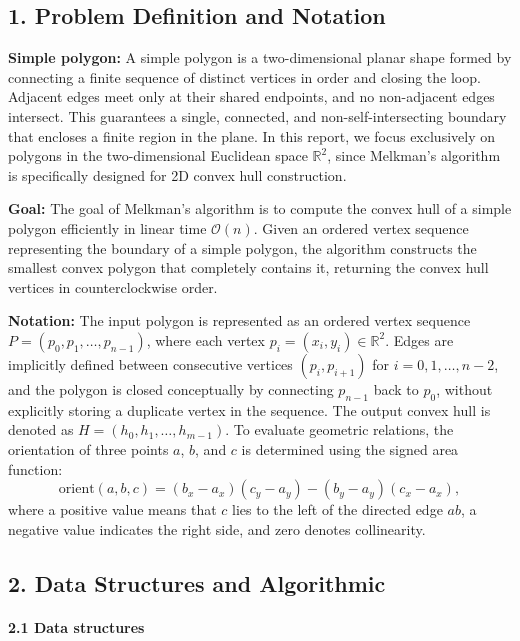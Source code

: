 \documentclass{article}
\begin{document}
\subsection*{1. Problem Definition and Notation}

\textbf{Simple polygon:} A simple polygon is a two-dimensional planar shape formed by connecting a finite sequence of distinct vertices in order and closing the loop. Adjacent edges meet only at their shared endpoints, and no non-adjacent edges intersect. This guarantees a single, connected, and non-self-intersecting boundary that encloses a finite region in the plane. In this report, we focus exclusively on polygons in the two-dimensional Euclidean space $\mathbb{R}^2$, since Melkman’s algorithm is specifically designed for 2D convex hull construction.

\textbf{Goal:} The goal of Melkman’s algorithm is to compute the convex hull of a simple polygon efficiently in linear time $\mathcal{O}(n)$. 
Given an ordered vertex sequence representing the boundary of a simple polygon, the algorithm constructs the smallest convex polygon that completely contains it, returning the convex hull vertices in counterclockwise order.

\textbf{Notation:} The input polygon is represented as an ordered vertex sequence $P = (p_0, p_1, \dots, p_{n-1})$, where each vertex $p_i = (x_i, y_i) \in \mathbb{R}^2$. 
Edges are implicitly defined between consecutive vertices $(p_i, p_{i+1})$ for $i = 0, 1, \dots, n-2$, and the polygon is closed conceptually by connecting $p_{n-1}$ back to $p_0$, without explicitly storing a duplicate vertex in the sequence. 
The output convex hull is denoted as $H = (h_0, h_1, \dots, h_{m-1})$. 
To evaluate geometric relations, the orientation of three points $a$, $b$, and $c$ is determined using the signed area function:
\[
\text{orient}(a,b,c) = (b_x - a_x)(c_y - a_y) - (b_y - a_y)(c_x - a_x),
\]
where a positive value means that $c$ lies to the left of the directed edge $ab$, a negative value indicates the right side, and zero denotes collinearity.

\subsection*{2. Data Structures and Algorithmic}

\paragraph{2.1 Data structures}\
\end{document}
